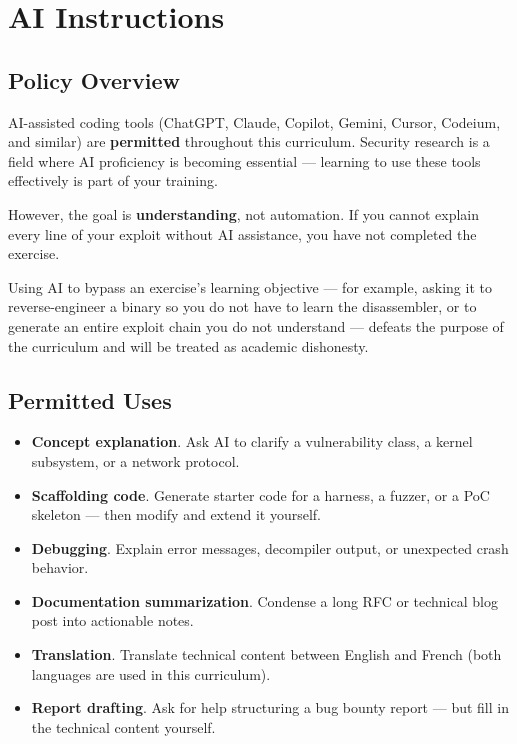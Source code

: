 \chapter{AI Instructions}

\section{Policy Overview}

AI-assisted coding tools (ChatGPT, Claude, Copilot, Gemini,
Cursor, Codeium, and similar) are \textbf{permitted} throughout
this curriculum. Security research is a field where AI proficiency
is becoming essential --- learning to use these tools effectively
is part of your training.

However, the goal is \textbf{understanding}, not automation.
If you cannot explain every line of your exploit without AI
assistance, you have not completed the exercise.

\begin{warning}
  Using AI to bypass an exercise's learning objective --- for
  example, asking it to reverse-engineer a binary so you do not
  have to learn the disassembler, or to generate an entire exploit
  chain you do not understand --- defeats the purpose of the
  curriculum and will be treated as academic dishonesty.
\end{warning}

\section{Permitted Uses}

\begin{itemize}
  \item \textbf{Concept explanation}. Ask AI to clarify a vulnerability
        class, a kernel subsystem, or a network protocol.
  \item \textbf{Scaffolding code}. Generate starter code for a harness,
        a fuzzer, or a PoC skeleton --- then modify and extend it
        yourself.
  \item \textbf{Debugging}. Explain error messages, decompiler output,
        or unexpected crash behavior.
  \item \textbf{Documentation summarization}. Condense a long RFC or
        technical blog post into actionable notes.
  \item \textbf{Translation}. Translate technical content between
        English and French (both languages are used in this curriculum).
  \item \textbf{Report drafting}. Ask for help structuring a bug bounty
        report --- but fill in the technical content yourself.
\end{itemize}

